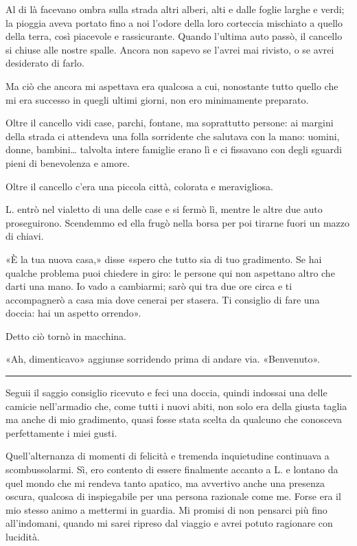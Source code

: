 \documentclass[a4paper,10pt]{memoir}
\begin{document}
Al di là facevano ombra sulla strada altri alberi, alti e dalle foglie larghe e verdi; la pioggia aveva portato fino a
noi l'odore della loro corteccia mischiato a quello della terra, così piacevole e rassicurante. Quando l'ultima auto
passò, il cancello si chiuse alle nostre spalle. Ancora non sapevo se l'avrei mai rivisto, o se avrei desiderato di
farlo.

Ma ciò che ancora mi aspettava era qualcosa a cui, nonostante tutto quello che mi era successo in quegli ultimi giorni,
non ero minimamente preparato.

Oltre il cancello vidi case, parchi, fontane, ma soprattutto persone: ai margini della strada ci attendeva una folla
sorridente che salutava con la mano: uomini, donne, bambini\dots{} talvolta intere famiglie erano lì e ci fissavano con
degli sguardi pieni di benevolenza e amore.

Oltre il cancello c'era una piccola città, colorata e meravigliosa.

L. entrò nel vialetto di una delle case e si fermò lì, mentre le altre due auto proseguirono. Scendemmo ed ella frugò
nella borsa per poi tirarne fuori un mazzo di chiavi.

«È la tua nuova casa,» disse «spero che tutto sia di tuo gradimento. Se hai qualche problema puoi chiedere in giro: le
persone qui non aspettano altro che darti una mano. Io vado a cambiarmi; sarò qui tra due ore circa e ti accompagnerò a
casa mia dove cenerai per stasera. Ti consiglio di fare una doccia: hai un aspetto orrendo».

Detto ciò tornò in macchina.

«Ah, dimenticavo» aggiunse sorridendo prima di andare via. «Benvenuto».

\plainbreak{1}

Seguii il saggio consiglio ricevuto e feci una doccia, quindi indossai una delle camicie nell'armadio che, come tutti i
nuovi abiti, non solo era della giusta taglia ma anche di mio gradimento, quasi fosse stata scelta da qualcuno che
conosceva perfettamente i miei gusti.

Quell'alternanza di momenti di felicità e tremenda inquietudine continuava a scombussolarmi. Sì, ero contento di essere
finalmente accanto a L. e lontano da quel mondo che mi rendeva tanto apatico, ma avvertivo anche una presenza oscura,
qualcosa di inspiegabile per una persona razionale come me. Forse era il mio stesso animo a mettermi in guardia. Mi
promisi di non pensarci più fino all'indomani, quando mi sarei ripreso dal viaggio e avrei potuto ragionare con
lucidità.
\end{document}
